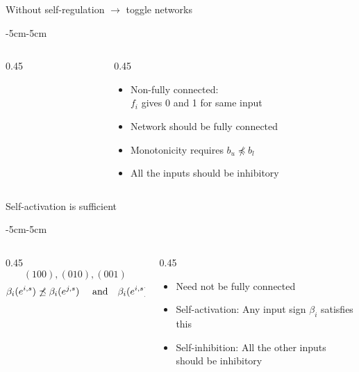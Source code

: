 \documentclass[aspectratio=169,9pt]{beamer}
\newcommand{\bzero}{{\bf 0}}
\theoremstyle{definition}
\theoremstyle{remark}
\begin{document}
\begin{frame}{Without self-regulation $\rightarrow$ toggle networks}
\begin{adjustwidth}{-5cm}{-5cm}
\begin{columns}
\begin{column}{0.45\textwidth}
{        }
    \end{column}
    \begin{column}{0.45\textwidth}
        \begin{itemize}
            \pause \item Non-fully connected: \\$f_i$ gives 0 and 1 for same input
            \pause \item Network should be fully connected
            \pause \item Monotonicity requires $b_u \not \preceq b_l$
            \pause \item All the inputs should be inhibitory
        \end{itemize}
    \end{column}
\end{columns}
\end{adjustwidth}
\end{frame}

\begin{frame}{Self-activation is sufficient}
\begin{adjustwidth}{-5cm}{-5cm}
\begin{columns}
    \begin{column}{0.45\textwidth}
        \[(100),(010),(001)\]
        \pause[1]
        \pause[2]
        \[\beta_i(e^{i,s})\not \preceq \beta_i(e^{j,s}) \quad \mbox{ and} \quad \beta_i(e^{i,s}) \not \preceq \beta_i(\bzero^s)\]
    \end{column}
     \begin{column}{0.45\textwidth}
        \begin{itemize}
            \pause[1] \item Need not be fully connected
            \pause[2] \item Self-activation: Any input sign $\beta_i$ satisfies this
            \pause[2] \item Self-inhibition: All the other inputs should be inhibitory
        \end{itemize}
    \end{column}
\end{columns}
\end{adjustwidth}
\end{frame}
\end{document}
